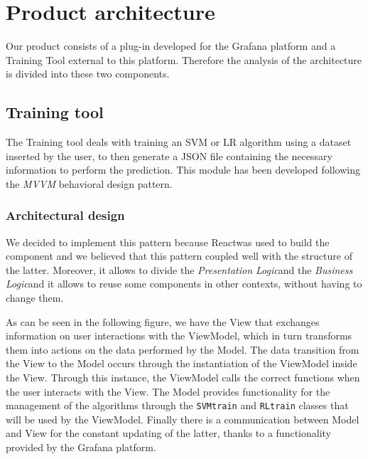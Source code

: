 \section{Product architecture}
Our product consists of a plug-in developed for the Grafana platform and a Training Tool external to this platform. Therefore the analysis of the architecture is divided into these two components.

\subsection{Training tool}
The Training tool deals with training an SVM or LR algorithm using a dataset inserted by the user, to then generate a JSON file containing the necessary information to perform the prediction. This module has been developed following the \textit{MVVM} behavioral design pattern.

\subsubsection{Architectural design}
We decided to implement this pattern because React\glo was used to build the component and we believed that this pattern coupled well with the structure of the latter. Moreover, it allows to divide the \textit{Presentation Logic}\glo and the \textit{Business Logic}\glo and it allows to reuse some components in other contexts, without having to change them.

As can be seen in the following figure, we have the View that exchanges information on user interactions with the ViewModel, which in turn transforms them into actions on the data performed by the Model.
The data transition from the View to the Model occurs through the instantiation of the ViewModel inside the View. Through this instance, the ViewModel calls the correct functions when the user interacts with the View. The Model provides functionality for the management of the algorithms through the \texttt{SVMtrain} and \texttt{RLtrain} classes that will be used by the ViewModel. 
Finally there is a communication between Model and View for the constant updating of the latter, thanks to a functionality provided by the Grafana platform.

